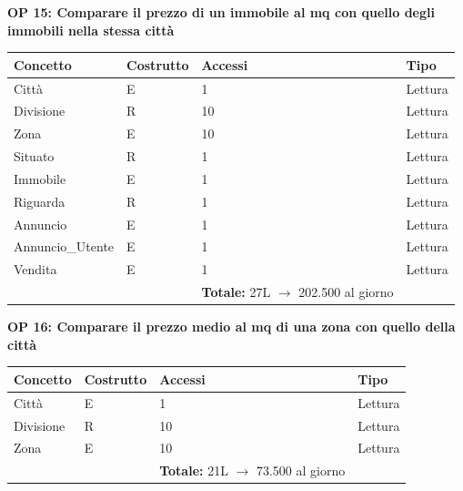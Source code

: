 \documentclass[a4paper,12pt]{report}
\begin{document}
            \noindent
            \textbf{OP 15: Comparare il prezzo di un immobile al mq con quello degli immobili nella stessa città}
        	\begin{table}[H]
            \centering
             \begin{tabular}{llll}
             \rowcolor{yellow!20} \textbf{Concetto} & \textbf{Costrutto} & \textbf{Accessi} & \textbf{Tipo}\\ [0.5ex] 
             \hline
             Città & E & 1 & Lettura \\ 
             Divisione & R & 10 & Lettura \\ 
             Zona & E & 10 & Lettura \\ 
             Situato & R & 1 & Lettura \\ 
             Immobile & E & 1 & Lettura \\ 
             Riguarda & R & 1 & Lettura \\ 
             Annuncio & E & 1 & Lettura \\ 
             Annuncio\_Utente & E & 1 & Lettura \\ 
             Vendita & E & 1 & Lettura \\ 

             \hline
                \rowcolor{yellow!20} &   & \textbf{Totale:} 27L $\rightarrow$ 202.500 al giorno &  \\ [1ex] 
             
             \end{tabular}
            \end{table}
            
            \noindent
            \textbf{OP 16: Comparare il prezzo medio al mq di una zona con quello della città}
        	\begin{table}[H]
            \centering
             \begin{tabular}{llll}
             \rowcolor{yellow!20} \textbf{Concetto} & \textbf{Costrutto} & \textbf{Accessi} & \textbf{Tipo}\\ [0.5ex] 
             \hline
             Città & E & 1 & Lettura \\ 
             Divisione & R & 10 & Lettura \\ 
             Zona & E & 10 & Lettura \\ 
             \hline
                \rowcolor{yellow!20} &   & \textbf{Totale:} 21L $\rightarrow$ 73.500 al giorno &  \\ [1ex] 
             
             \end{tabular}
            \end{table}
\end{document}
